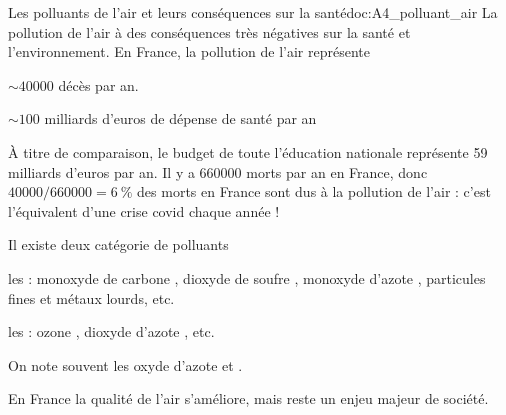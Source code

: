 \begin{doc}{Les polluants de l'air et leurs conséquences sur la santé}{doc:A4_polluant_air}
  La pollution de l'air à des conséquences très négatives sur la santé et l'environnement.
  En France, la pollution de l'air représente
  \begin{listePoints}
    \item $\sim \num{40000}$ décès par an.
    \item $\sim 100$ milliards d'euros de dépense de santé par an 
  \end{listePoints}
  À titre de comparaison, le budget de toute l'éducation nationale représente 59 milliards d'euros par an. 
  Il y a \num{660 000} morts par an en France, donc $\num{40000}/\num{660000} = \qty{6}{\percent}$ des morts en France sont dus à la pollution de l'air : c'est l'équivalent d'une crise covid chaque année !

  \begin{encart}
    Il existe deux catégorie de polluants
    \begin{listePoints}
      \item les  : monoxyde de carbone , dioxyde de soufre , monoxyde d'azote , particules fines et métaux lourds, etc.
      \item les  : ozone , dioxyde d'azote , etc.
    \end{listePoints}
    On note souvent  les oxyde d'azote  et .
  \end{encart}
  
  En France la qualité de l'air s'améliore, mais reste un enjeu majeur de société.

  \begin{center}
  \end{center}
\end{doc}



